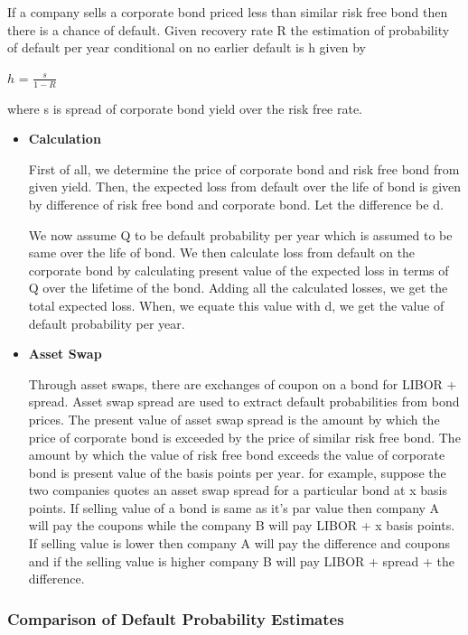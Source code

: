 \documentclass[11pt]{article}
\numberwithin{equation}{section}
\begin{document}
 If a company sells a corporate bond priced less than similar risk free bond then there is a chance of default. 
Given recovery rate R the estimation of probability of default per year conditional on no earlier default is h given by 
\begin{center}
	$ h $ = $\frac{s}{1-R}$
\end{center}
where s is spread of corporate bond yield over the risk free rate.
\begin{itemize}
\item \textbf{Calculation}
\medskip

First of all, we determine the price of corporate bond and risk free bond from given yield. Then, the expected loss from default over the life of bond is given by difference of risk free bond and corporate bond. Let the difference be d.\medskip

 \hspace{1cm}We now assume Q to be default probability per year which is assumed to be same over the life of bond. We then calculate loss from default on the corporate bond by calculating present value of the expected loss in terms of Q over the lifetime of the bond. Adding all the calculated losses, we get the total expected loss. When, we equate this value with d, we get the value of default probability per year.
 
 \item \textbf{Asset Swap}
 \medskip
 
 Through asset swaps, there are exchanges of coupon on a bond for LIBOR + spread. Asset swap spread are used to extract default probabilities from bond prices. The present value of asset swap spread is the amount by which the price of corporate bond is exceeded by the price of similar risk free bond. The amount by which the value of risk free bond exceeds the value of corporate bond is present value of the basis points per year.
 for example, suppose the two companies quotes an asset swap spread for a particular bond at x basis points. If selling  value of a bond is same as it's par value then company A will pay the coupons while the company B will pay LIBOR + x basis points. If selling value is lower then company A will pay the difference and coupons and if the selling value is higher company B will pay LIBOR + spread + the difference. 
   
\end{itemize}

\subsubsection{Comparison of Default Probability Estimates }
\medskip
\end{document}
